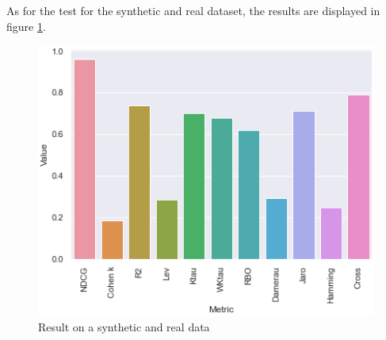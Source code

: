 As for the test for the synthetic and real dataset, the results are displayed in figure \ref{fig:synth_result}.
\begin{figure}[htbp]
\centering
\caption{Result on a synthetic and real data }\label{fig:synth_result} 
\includegraphics[scale=0.65]{figures/synthetic.png}
\end{figure}
